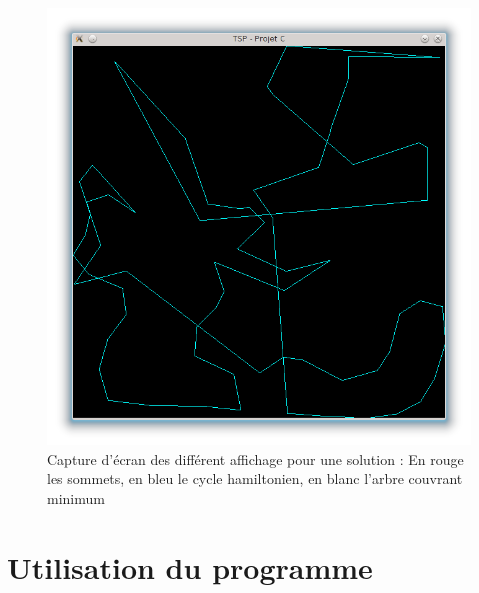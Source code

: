 \documentclass[a4paper,11pt]{article}
\begin{document}
\begin{center}
\begin{figure}[h]
\begin{center}
\includegraphics[scale=0.3]{cycleC.png}
\caption{Capture d'écran des différent affichage pour une solution : En rouge les sommets, en bleu le cycle hamiltonien, en blanc l'arbre couvrant minimum}
\label{fig3}
\end{center}
\end{figure}
\end{center}
\section{Utilisation du programme} %
\end{document}
